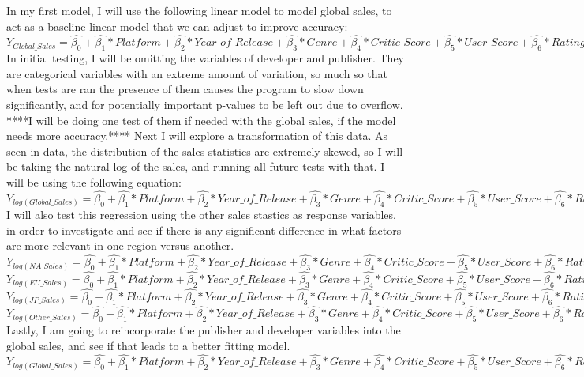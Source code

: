 \documentclass[12pt]{article}
\begin{document}
In my first model, I will use the following linear model to model global sales, to act as a baseline linear model that we can adjust to improve accuracy:
$Y_{Global\_Sales}=\hat{\beta_{0}}+\hat{\beta_{1}}*Platform+\hat{\beta_{2}}*Year\_of\_Release+\hat{\beta_{3}}*Genre+\hat{\beta_{4}}*Critic\_Score+\hat{\beta_{5}}*User\_Score+\hat{\beta_{6}}*Rating+\hat{\beta_{7}}*Critic\_Count+\hat{\beta_{8}}*Critic\_Count$
In initial testing, I will be omitting the variables of developer and publisher. They are categorical variables with an extreme amount of variation,
so much so that when tests are ran the presence of them causes the program to slow down significantly, and for potentially important p-values to be left out due to overflow.
****I will be doing one test of them if needed with the global sales, if the model needs more accuracy.****
Next I will explore a transformation of this data. As seen in data, the distribution of the sales statistics are extremely skewed, so I will be taking  
the natural log of the sales, and running all future tests with that. I will be using the following equation:
$Y_{log(Global\_Sales)}=\hat{\beta_{0}}+\hat{\beta_{1}}*Platform+\hat{\beta_{2}}*Year\_of\_Release+\hat{\beta_{3}}*Genre+\hat{\beta_{4}}*Critic\_Score+\hat{\beta_{5}}*User\_Score+\hat{\beta_{6}}*Rating+\hat{\beta_{7}}*Critic\_Count+\hat{\beta_{8}}*Critic\_Count$
I will also test this regression using the other sales stastics as response variables, in order to investigate and see if there is any significant difference in what factors are more relevant in one region versus another.
$Y_{log(NA\_Sales)}=\hat{\beta_{0}}+\hat{\beta_{1}}*Platform+\hat{\beta_{2}}*Year\_of\_Release+\hat{\beta_{3}}*Genre+\hat{\beta_{4}}*Critic\_Score+\hat{\beta_{5}}*User\_Score+\hat{\beta_{6}}*Rating+\hat{\beta_{7}}*Critic\_Count+\hat{\beta_{8}}*Critic\_Count$
$Y_{log(EU\_Sales)}=\hat{\beta_{0}}+\hat{\beta_{1}}*Platform+\hat{\beta_{2}}*Year\_of\_Release+\hat{\beta_{3}}*Genre+\hat{\beta_{4}}*Critic\_Score+\hat{\beta_{5}}*User\_Score+\hat{\beta_{6}}*Rating+\hat{\beta_{7}}*Critic\_Count+\hat{\beta_{8}}*Critic\_Count$
$Y_{log(JP\_Sales)}=\hat{\beta_{0}}+\hat{\beta_{1}}*Platform+\hat{\beta_{2}}*Year\_of\_Release+\hat{\beta_{3}}*Genre+\hat{\beta_{4}}*Critic\_Score+\hat{\beta_{5}}*User\_Score+\hat{\beta_{6}}*Rating+\hat{\beta_{7}}*Critic\_Count+\hat{\beta_{8}}*Critic\_Count$
$Y_{log(Other\_Sales)}=\hat{\beta_{0}}+\hat{\beta_{1}}*Platform+\hat{\beta_{2}}*Year\_of\_Release+\hat{\beta_{3}}*Genre+\hat{\beta_{4}}*Critic\_Score+\hat{\beta_{5}}*User\_Score+\hat{\beta_{6}}*Rating+\hat{\beta_{7}}*Critic\_Count+\hat{\beta_{8}}*Critic\_Count$
Lastly, I am going to reincorporate the publisher and developer variables into the global sales, and see if that leads to a better fitting model.
$Y_{log(Global\_Sales)}=\hat{\beta_{0}}+\hat{\beta_{1}}*Platform+\hat{\beta_{2}}*Year\_of\_Release+\hat{\beta_{3}}*Genre+\hat{\beta_{4}}*Critic\_Score+\hat{\beta_{5}}*User\_Score+\hat{\beta_{6}}*Rating+\hat{\beta_{7}}*Critic\_Count+\hat{\beta_{8}}*Critic\_Count+\hat{\beta_{9}}*Developer+\hat{\beta_{10}}*Publisher$
\end{document}
